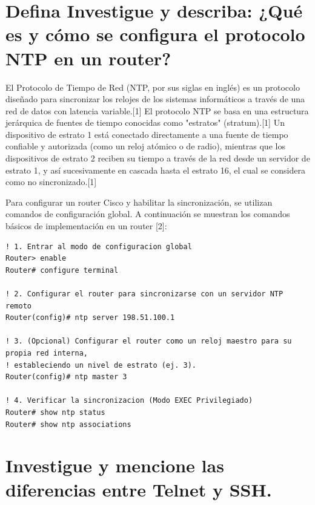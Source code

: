 \documentclass[a4paper,12pt]{article}
\begin{document}
\renewcommand{\footrulewidth}{0.4pt}  %

\setcounter{page}{1}

\tableofcontents

\newpage

\section{Defina Investigue y describa: ¿Qué es y cómo se configura el protocolo NTP en un router?}

El Protocolo de Tiempo de Red (NTP, por sus siglas en inglés) es un protocolo diseñado para sincronizar los relojes de los sistemas informáticos a través de una red de datos con latencia variable.[1] El protocolo NTP se basa en una estructura jerárquica de fuentes de tiempo conocidas como "estratos" (stratum).[1] Un dispositivo de estrato 1 está conectado directamente a una fuente de tiempo confiable y autorizada (como un reloj atómico o de radio), mientras que los dispositivos de estrato 2 reciben su tiempo a través de la red desde un servidor de estrato 1, y así sucesivamente en cascada hasta el estrato 16, el cual se considera como no sincronizado.[1]

Para configurar un router Cisco y habilitar la sincronización, se utilizan comandos de configuración global. A continuación se muestran los comandos básicos de implementación en un router [2]:

\begin{lstlisting}
! 1. Entrar al modo de configuracion global
Router> enable
Router# configure terminal

! 2. Configurar el router para sincronizarse con un servidor NTP remoto
Router(config)# ntp server 198.51.100.1

! 3. (Opcional) Configurar el router como un reloj maestro para su propia red interna,
! estableciendo un nivel de estrato (ej. 3).
Router(config)# ntp master 3

! 4. Verificar la sincronizacion (Modo EXEC Privilegiado)
Router# show ntp status
Router# show ntp associations
\end{lstlisting}


\newpage
\section{Investigue y mencione las diferencias entre Telnet y SSH.}
\end{document}
